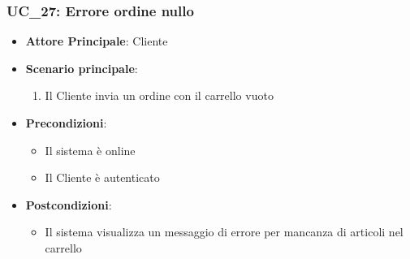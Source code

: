 \subsubsection{UC\_27: Errore ordine nullo}
\label{uc_27}

\begin{itemize}
    \item \textbf{Attore Principale}: Cliente
	 \item \textbf{Scenario principale}:
    \begin{enumerate}
        \item Il Cliente invia un ordine con il carrello vuoto
    \end{enumerate}
	\item \textbf{Precondizioni}:
	\begin{itemize}
		\item Il sistema è online
		\item Il Cliente è autenticato
	\end{itemize}
	\item \textbf{Postcondizioni}:
	\begin{itemize}
		\item Il sistema visualizza un messaggio di errore per mancanza di articoli nel carrello
	\end{itemize}
\end{itemize}
